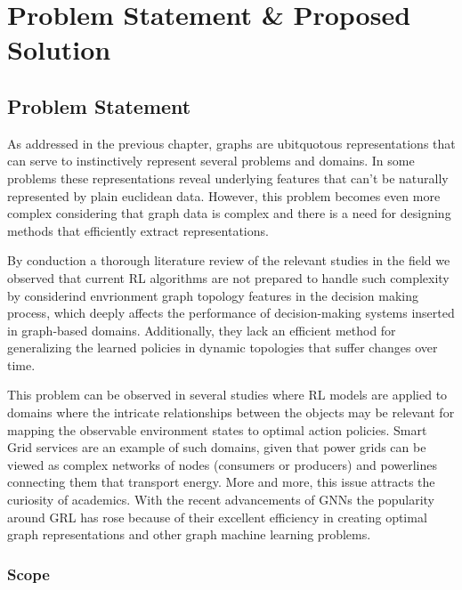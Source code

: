 \chapter{Problem Statement \& Proposed Solution} \label{chap:proposed-solution}

\section{Problem Statement}

As addressed in the previous chapter, graphs are ubitquotous representations that can serve to instinctively represent several problems and domains. In some problems these representations reveal underlying features that can't be naturally represented by plain euclidean data. However, this problem becomes even more complex considering that graph data is complex and there is a need for designing methods that efficiently extract representations. \par
By conduction a thorough literature review of the relevant studies in the field we observed that current \ac{RL} algorithms are not prepared to handle such complexity by considerind envrionment graph topology features in the decision making process, which deeply affects the performance of decision-making systems inserted in graph-based domains. Additionally, they lack an efficient method for generalizing the learned policies in dynamic topologies that suffer changes over time.
 \par
This problem can be observed in several studies where RL models are applied to domains where the intricate relationships between the objects may be relevant for mapping the observable environment states to optimal action policies. Smart Grid services are an example of such domains, given that power grids can be viewed as complex networks of nodes (consumers or producers) and powerlines connecting them that transport energy. 
More and more, this issue attracts the curiosity of academics. With the recent advancements of GNNs the popularity around \ac{GRL} has rose because of their excellent efficiency in creating optimal graph representations and other graph machine learning problems.

\subsection{Scope}

